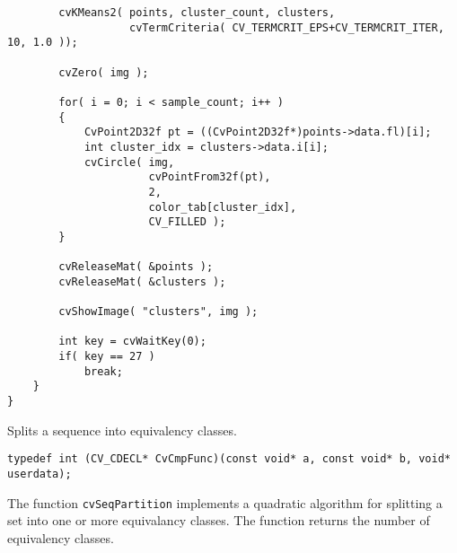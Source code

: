 \begin{lstlisting}
        cvKMeans2( points, cluster_count, clusters,
                   cvTermCriteria( CV_TERMCRIT_EPS+CV_TERMCRIT_ITER, 10, 1.0 ));

        cvZero( img );

        for( i = 0; i < sample_count; i++ )
        {
            CvPoint2D32f pt = ((CvPoint2D32f*)points->data.fl)[i];
            int cluster_idx = clusters->data.i[i];
            cvCircle( img,
                      cvPointFrom32f(pt),
                      2,
                      color_tab[cluster_idx],
                      CV_FILLED );
        }

        cvReleaseMat( &points );
        cvReleaseMat( &clusters );

        cvShowImage( "clusters", img );

        int key = cvWaitKey(0);
        if( key == 27 )
            break;
    }
}
\end{lstlisting}

Splits a sequence into equivalency classes.

\begin{lstlisting}
typedef int (CV_CDECL* CvCmpFunc)(const void* a, const void* b, void* userdata);
\end{lstlisting}


\begin{description}
\end{description}

The function \texttt{cvSeqPartition} implements a quadratic algorithm for
splitting a set into one or more equivalancy classes. The function
returns the number of equivalency classes.


